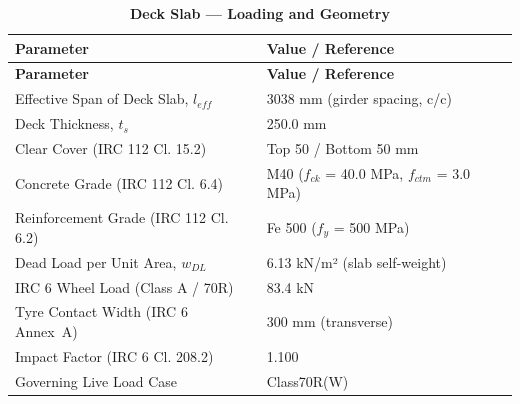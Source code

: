\documentclass[12pt,a4paper]{report}
\numberwithin{table}{chapter}
\numberwithin{figure}{chapter}
\begin{document}
\vspace{1em}
\begin{longtable}{|L{5.5cm}|p{10.0cm}|}
\caption{\textbf{Deck Slab --- Loading and Geometry}}
\hline

\textbf{Parameter} & \textbf{Value / Reference} \\[6pt]

\hline

\endfirsthead

\hline

\textbf{Parameter} & \textbf{Value / Reference} \\[6pt]

\hline

\endhead
\hline
\textnormal{Effective Span of Deck Slab, $l_{eff}$} & 3038 mm (girder spacing, c/c) \\[6pt]
\hline
\textnormal{Deck Thickness, $t_s$} & 250.0 mm \\[6pt]
\hline
\textnormal{Clear Cover (IRC 112 Cl. 15.2)} & Top 50 / Bottom 50 mm \\[6pt]
\hline
\textnormal{Concrete Grade (IRC 112 Cl. 6.4)} & M40 ($f_{ck}$ = 40.0 MPa, $f_{ctm}$ = 3.0 MPa) \\[6pt]
\hline
\textnormal{Reinforcement Grade (IRC 112 Cl. 6.2)} & Fe 500 ($f_y$ = 500 MPa) \\[6pt]
\hline
\textnormal{Dead Load per Unit Area, $w_{DL}$} & 6.13 kN/m² (slab self-weight) \\[6pt]
\hline
\textnormal{IRC 6 Wheel Load (Class A / 70R)} & 83.4 kN \\[6pt]
\hline
\textnormal{Tyre Contact Width (IRC 6 Annex~A)} & 300 mm (transverse) \\[6pt]
\hline
\textnormal{Impact Factor (IRC 6 Cl. 208.2)} & 1.100 \\[6pt]
\hline
\textnormal{Governing Live Load Case} & Class70R(W) \\[6pt]
\hline
\end{longtable}
\newpage
\vspace{1em}
\end{document}
